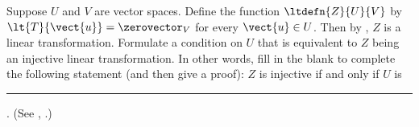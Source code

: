 Suppose $U$ and $V$ are vector spaces.  Define the function $\ltdefn{Z}{U}{V}$ by $\lt{T}{\vect{u}}=\zerovector_{V}$ for every $\vect{u}\in U$.  Then by , $Z$ is a linear transformation.  Formulate a condition on $U$ that is equivalent to $Z$ being an injective linear transformation.   In other words, fill in the blank to complete the following statement (and then give a proof):  $Z$ is injective if and only if $U$ is \rule{1in}{1pt}. (See , .)